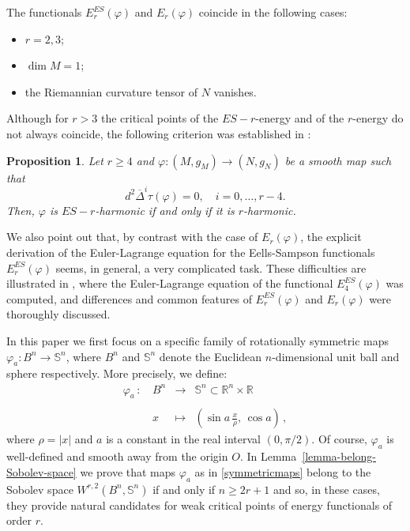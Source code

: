\documentclass[11pt]{amsart}
\theoremstyle{plain}
\newtheorem{proposition}  [theorem]  {Proposition}
\theoremstyle{definition}
\numberwithin{equation}{section}
\def \R{{\mathbb R}}
\def \s{{\mathbb S}}
\def \link {~}
\numberwithin{equation}{section}
\begin{document}
The functionals $E^{ES}_r(\varphi)$ and $E_r(\varphi)$ coincide in the following cases:
\begin{itemize}
\item [{\rm (i)}] $r=2,3$;
\item [{\rm (ii)}] $\dim M=1$;
\item [{\rm (iii)}] the Riemannian curvature tensor of $N$ vanishes.
\end{itemize}
Although for $r > 3$ the critical points of the $ES-r$-energy and of the $r$-energy do not always coincide, the following criterion was established in \cite[p. 370]{MOR22}:
\begin{proposition}\label{pro-general-criterium-ES-r}
Let $r\geq 4$ and  $\varphi:(M,g_M)\to (N,g_N)$ be a smooth map such that 
\[
d^2\overline{\Delta}^i\tau(\varphi) = 0, \quad i=0,\dots,r-4.
\]
Then,  $\varphi$ is $ES-r$-harmonic if and only if it is $r$-harmonic.
\end{proposition}
We also point out that, by contrast with the case of $E_r(\varphi)$, the explicit derivation of the Euler-Lagrange equation for the Eells-Sampson functionals $E^{ES}_r(\varphi)$ seems, in general, a very complicated task. These difficulties are illustrated in \cite{BMOR1}, where the Euler-Lagrange equation of the functional $E^{ES}_4(\varphi)$ was computed, and differences and common features of $E^{ES}_r(\varphi)$ and $E_r(\varphi)$ were thoroughly discussed.

In this paper we first focus on a specific family of rotationally symmetric maps $\varphi_a : B^n \to \s^n$, where $B^n$ and $\s^n$ denote the Euclidean $n$-dimensional unit ball and sphere respectively. More precisely, we define:
\begin{equation}\label{symmetricmaps}\begin{array}{lcll}
                                           \varphi_{a} \,:\, &B^n &\to &  \s^n \subset \R^n \times \R \\
                                           &&& \\
                                           &x &\mapsto & ( \sin a\,{\frac{x}{\rho}}, \,\cos a) \, ,
                                         \end{array}
\end{equation}
where $\rho=|x|$ and $a$ is a constant in the real interval $(0,\pi / 2)$. Of course, $\varphi_{a}$ is well-defined and smooth away from the origin $O$. In Lemma\link\ref{lemma-belong-Sobolev-space} we prove that maps $\varphi_a$ as in \eqref{symmetricmaps} belong to the Sobolev space $W^{r,2}\left ( B^n,\s^n\right )$ if and only if $n \geq 2r+1$ and so, in these cases, they provide natural candidates for weak critical points of energy functionals of order $r$. 
\end{document}
